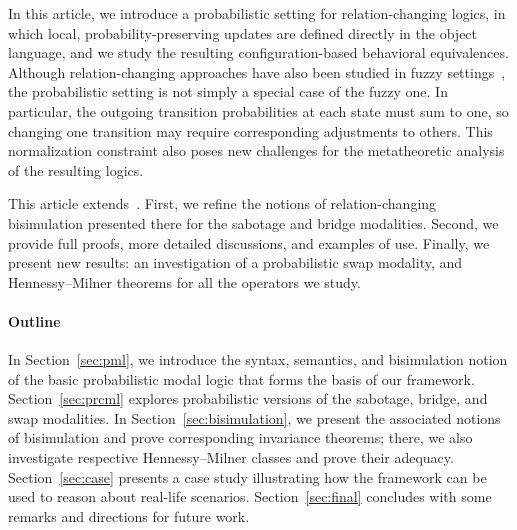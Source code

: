 In this article, we introduce a probabilistic setting for relation-changing logics, in which local, probability-preserving updates are defined directly in the object language, and we study the resulting configuration-based behavioral equivalences. Although relation-changing approaches have also been studied in fuzzy settings~\cite{FFM25}, the probabilistic setting is not simply a special case of the fuzzy one. In particular, the outgoing transition probabilities at each state must sum to one, so changing one transition may require corresponding adjustments to others. This normalization constraint also poses new challenges for the metatheoretic analysis of the resulting logics.

This article extends~\cite{FFM25b}. First, we refine the notions of relation-changing bisimulation presented there for the sabotage and bridge modalities. Second, we provide full proofs, more detailed discussions, and examples of use. Finally, we present new results: an investigation of a probabilistic swap modality, and Hennessy--Milner theorems for all the operators we study.

\paragraph{Outline} In Section~\ref{sec:pml}, we introduce the syntax, semantics, and bisimulation notion of the basic probabilistic modal logic that forms the basis of our framework. Section~\ref{sec:prcml} explores probabilistic versions of the sabotage, bridge, and swap modalities. In Section~\ref{sec:bisimulation}, we present the associated notions of bisimulation and prove corresponding invariance theorems; there, we also investigate  respective Hennessy--Milner classes and prove their adequacy. Section~\ref{sec:case} presents a case study illustrating how the framework can be used to reason about real-life scenarios. Section~\ref{sec:final} concludes with some remarks and directions for future work.